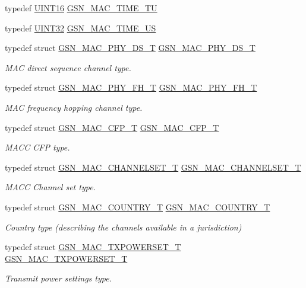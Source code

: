 \begin{DoxyCompactItemize}
typedef \hyperlink{a00660_ga09f1a1fb2293e33483cc8d44aefb1eb1}{UINT16} \hyperlink{a00522_a4357e93aba9b5a4deb42a1b85eb03053}{GSN\_\-MAC\_\-TIME\_\-TU}
\item 
typedef \hyperlink{a00660_gae1e6edbbc26d6fbc71a90190d0266018}{UINT32} \hyperlink{a00522_a9913c71e1c3b2be07fb0c41b585087ad}{GSN\_\-MAC\_\-TIME\_\-US}
\item 
typedef struct \hyperlink{a00119}{GSN\_\-MAC\_\-PHY\_\-DS\_\-T} \hyperlink{a00642_gaaa415fc5bf3610b9f39d91d220983e10}{GSN\_\-MAC\_\-PHY\_\-DS\_\-T}
\begin{DoxyCompactList}\small\item\em MAC direct sequence channel type. \end{DoxyCompactList}\item 
typedef struct \hyperlink{a00120}{GSN\_\-MAC\_\-PHY\_\-FH\_\-T} \hyperlink{a00642_ga929013282703665ac236cdc91ee3c3f7}{GSN\_\-MAC\_\-PHY\_\-FH\_\-T}
\begin{DoxyCompactList}\small\item\em MAC frequency hopping channel type. \end{DoxyCompactList}\item 
typedef struct \hyperlink{a00112}{GSN\_\-MAC\_\-CFP\_\-T} \hyperlink{a00642_gad5d3559fa1fc09e64eb23e72d14a503a}{GSN\_\-MAC\_\-CFP\_\-T}
\begin{DoxyCompactList}\small\item\em MACC CFP type. \end{DoxyCompactList}\item 
typedef struct \hyperlink{a00114}{GSN\_\-MAC\_\-CHANNELSET\_\-T} \hyperlink{a00642_gacacca7fcdec7f267751d787618578af1}{GSN\_\-MAC\_\-CHANNELSET\_\-T}
\begin{DoxyCompactList}\small\item\em MACC Channel set type. \end{DoxyCompactList}\item 
typedef struct \hyperlink{a00115}{GSN\_\-MAC\_\-COUNTRY\_\-T} \hyperlink{a00642_gaa312c43eca44aa7bb2ab45da931da79f}{GSN\_\-MAC\_\-COUNTRY\_\-T}
\begin{DoxyCompactList}\small\item\em Country type (describing the channels available in a jurisdiction) \end{DoxyCompactList}\item 
typedef struct \hyperlink{a00135}{GSN\_\-MAC\_\-TXPOWERSET\_\-T} \hyperlink{a00642_ga4e1e0373dd92610638567c678eeee81d}{GSN\_\-MAC\_\-TXPOWERSET\_\-T}
\begin{DoxyCompactList}\small\item\em Transmit power settings type. \end{DoxyCompactList}\item 

\end{DoxyCompactItemize}
